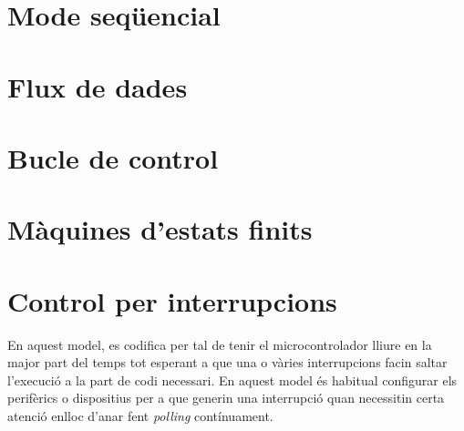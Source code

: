 \chapter{Mode seqüencial}
\lipsum

\chapter{Flux de dades}
\lipsum

\chapter{Bucle de control}
\label{ch:buclecontrol}

\lipsum

\chapter{Màquines d'estats finits}
\label{ch:maquinesstats}

\lipsum

\chapter{Control per interrupcions}
En aquest model, es codifica per tal de tenir el microcontrolador lliure en la major part del temps tot esperant a que una o vàries interrupcions facin saltar l'execució a la part de codi necessari. En aquest model és habitual configurar els perifèrics o dispositius per a que generin una interrupció quan necessitin certa atenció enlloc d'anar fent {\em polling} contínuament.





